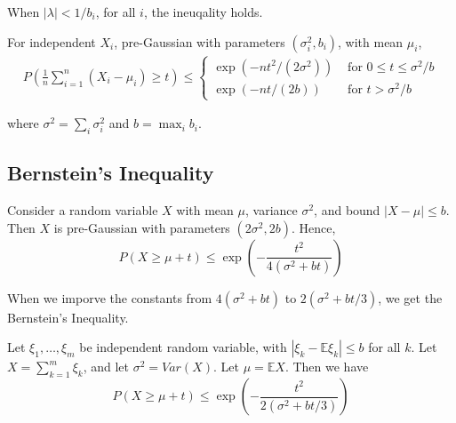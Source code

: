 When $\left| \lambda \right| < 1/b_i$, for all $i$, the ineuqality holds.

\begin{theorem} \cite*{Bartlett:2020}
  For independent $X_i$, pre-Gaussian with parameters $(\sigma_{i}^2 , b_i)$, with mean $\mu_i$,
  \begin{equation}
    \begin{array}{l}
    P\left(\frac{1}{n} \sum_{i=1}^{n}\left(X_{i}-\mu_{i}\right) \geq t\right) \leq\left\{\begin{array}{ll}
    \exp \left(-n t^{2} /\left(2 \sigma^{2}\right)\right) & \text { for } 0 \leq t \leq \sigma^{2} / b \\
    \exp (-n t /(2 b)) & \text { for } t>\sigma^{2} / b
    \end{array}\right. 
    
    \end{array}
    \end{equation}
\end{theorem}

where $\sigma^{2}=\sum_{i} \sigma_{i}^{2}$ and $b=\max _{i} b_{i}$.

\subsection{Bernstein's Inequality}

Consider a random variable $X$ with mean $\mu$, variance $\sigma^2$, and bound $\left| X-\mu \right| \leq b$.
Then $X$ is pre-Gaussian with parameters $(2\sigma^2 , 2b)$. Hence,
\begin{equation}
  P(X \geq \mu+t) \leq \exp \left(-\frac{t^{2}}{4\left(\sigma^{2}+b t\right)}\right)
\end{equation}

When we imporve the constants from $4\left(\sigma^{2}+b t\right)$ to $2(\sigma^2 + bt/3)$, we get the Bernstein's Inequality.

\begin{theorem} \cite*{Kutin:2002}
  Let $\xi_{1}, \dots, \xi_{m}$ be independent random variable, with $\left| \xi_k - \mathbb{E}\xi_k \right| \leq b$ for all $k$. 
  Let $X = \sum_{k=1}^{m} \xi_k$, and let $\sigma^2 = Var(X)$.
  Let $\mu = \mathbb{E}X$. Then we have
  \begin{equation}
    P(X \geq \mu+t) \leq \exp \left(-\frac{t^{2}}{2(\sigma^2 + bt/3)}\right)
  \end{equation}  
\end{theorem}


